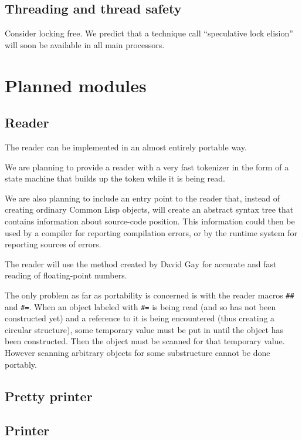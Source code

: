 \documentclass{article}
\begin{document}
\subsection{Threading and thread safety}

Consider locking free.  We predict that a technique call ``speculative
lock elision'' will soon be available in all main processors. 

\section{Planned modules}

\subsection{Reader}

The reader can be implemented in an almost entirely portable way.  

We are planning to provide a reader with a very fast tokenizer in the
form of a state machine that builds up the token while it is being
read.  

We are also planning to include an entry point to the reader that,
instead of creating ordinary Common Lisp objects, will create an
abstract syntax tree that contains information about source-code
position.  This information could then be used by a compiler for
reporting compilation errors, or by the runtime system for reporting
sources of errors. 

The reader will use the method created by David Gay for accurate and
fast reading of floating-point numbers. 

The only problem as far as portability is concerned is with the reader
macros \texttt{\#\#} and \texttt{\#=}.  When an object labeled with
\texttt{\#=} is being read (and so has not been constructed yet) and a
reference to it is being encountered (thus creating a circular
structure), some temporary value must be put in until the object has
been constructed.  Then the object must be scanned for that temporary
value.  However scanning arbitrary objects for some substructure
cannot be done portably.

\subsection{Pretty printer}

\subsection{Printer}
\end{document}

